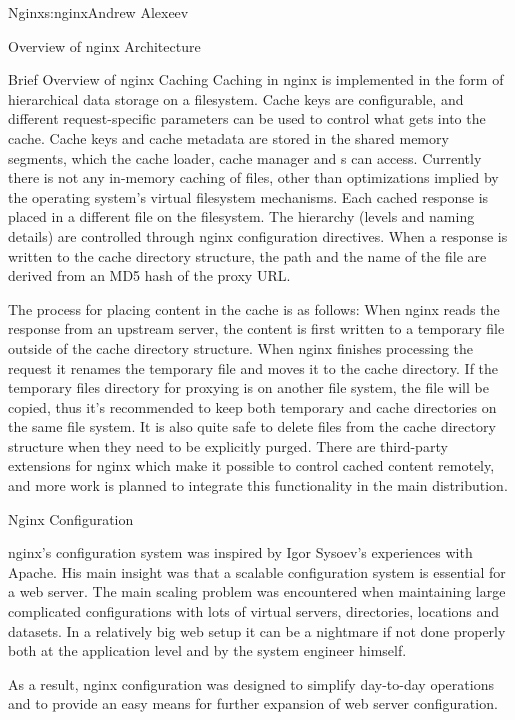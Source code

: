 \begin{aosachapter}{Nginx}{s:nginx}{Andrew Alexeev}
\begin{aosasect1}{Overview of nginx Architecture}
\begin{aosasect2}{Brief Overview of nginx Caching}
Caching in nginx is implemented in the form of hierarchical data
storage on a filesystem. Cache keys are configurable, and different
request-specific parameters can be used to control what gets into the
cache. Cache keys and cache metadata are stored in the shared memory
segments, which the cache loader, cache manager and s
can access. Currently there is not any in-memory caching of files,
other than optimizations implied by the operating system's virtual
filesystem mechanisms. Each cached response is placed in a different
file on the filesystem. The hierarchy (levels and naming details) are
controlled through nginx configuration directives. When a response is
written to the cache directory structure, the path and the name of the
file are derived from an MD5 hash of the proxy URL.

The process for placing content in the cache is as follows:
When nginx reads the response from an upstream server, the
content is first written to a temporary file outside of the cache
directory structure. When nginx finishes processing the request it
renames the temporary file and moves it to the cache directory. If the
temporary files directory for proxying is on another file system, the
file will be copied, thus it's recommended to keep both temporary and
cache directories on the same file system. It is also quite safe to
delete files from the cache directory structure when they need to be
explicitly purged. There are third-party extensions for nginx
which make it possible to control cached content remotely,
and more work is planned to integrate this functionality in the main
distribution.

\end{aosasect2}

\end{aosasect1}

\begin{aosasect1}{Nginx Configuration}

nginx's configuration system was inspired by Igor Sysoev's experiences with
Apache. His main insight was 
that a scalable configuration system
is essential for a web server. The main scaling problem was
encountered when maintaining large complicated configurations with
lots of virtual servers, directories, locations and datasets. In a
relatively big web setup it can be a nightmare if not done properly
both at the application level and by the system engineer himself.

As a result, nginx configuration was designed to simplify day-to-day
operations and to provide an easy means for further expansion of web
server configuration.


\end{aosasect1}
\end{aosachapter}

